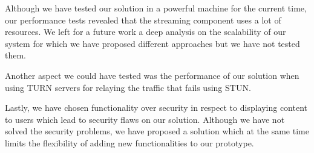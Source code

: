\documentclass[10pt,conference]{IEEEtran}
\begin{document}
	Although we have tested our solution in a powerful machine for the current time, our performance tests revealed that the streaming component uses a lot of resources. We left for a future work a deep analysis on the scalability of our system for which we have proposed different approaches but we have not tested them.

	Another aspect we could have tested was the performance of our solution when using \gls{TURN} servers for relaying the traffic that fails using \gls{STUN}.

	Lastly, we have chosen functionality over security in respect to displaying content to users which lead to security flaws on our solution. Although we have not solved the security problems, we have proposed a solution which at the same time limits the flexibility of adding new functionalities to our prototype.






\end{document}
